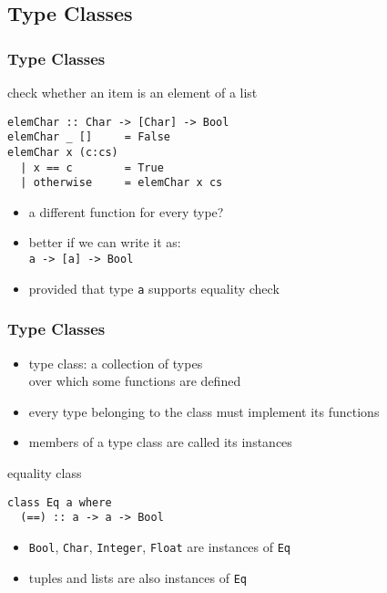 \documentclass[dvipsnames]{beamer}
\theoremstyle{plain}
\begin{document}
\subsection{Type Classes}

\begin{frame}[fragile]
  \frametitle{Type Classes}

  \begin{exampleblock}{check whether an item is an element of a list}
    \begin{lstlisting}
elemChar :: Char -> [Char] -> Bool
elemChar _ []     = False
elemChar x (c:cs)
  | x == c        = True
  | otherwise     = elemChar x cs
    \end{lstlisting}
  \end{exampleblock}

  \pause
  \begin{itemize}
    \item a different function for every type?
    \item better if we can write it as:\\
      \lstinline|a -> [a] -> Bool|
    \item provided that type \lstinline|a| supports equality check
  \end{itemize}
\end{frame}

\begin{frame}[fragile]
  \frametitle{Type Classes}

  \begin{itemize}
    \item \alert{type class}: a collection of types\\
      over which some functions are defined
    \item every type belonging to the class must implement its functions
    \item members of a type class are called its \alert{instances}
  \end{itemize}

  \pause
  \begin{exampleblock}{equality class}
    \begin{lstlisting}
class Eq a where
  (==) :: a -> a -> Bool
    \end{lstlisting}
    \begin{itemize}
      \item \lstinline|Bool|, \lstinline|Char|, \lstinline|Integer|, \lstinline|Float|
        are instances of \lstinline|Eq|
      \item tuples and lists are also instances of \lstinline|Eq|
    \end{itemize}
  \end{exampleblock}
\end{frame}
\end{document}
